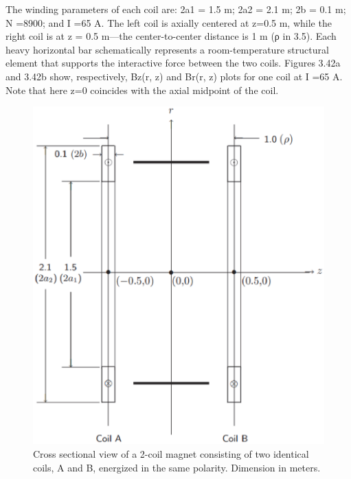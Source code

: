 The winding parameters of each coil are: 2a1 = 1.5 m; 2a2 = 2.1 m; 2b = 0.1 m;
N =8900; and I =65 A. The left coil is axially centered at z=0.5 m, while the right
coil is at z = 0.5 m—the center-to-center distance is 1 m (ρ in 3.5). Each heavy
horizontal bar schematically represents a room-temperature structural element
that supports the interactive force between the two coils.
Figures 3.42a and 3.42b show, respectively, Bz(r, z) and Br(r, z) plots for one coil
at I =65 A. Note that here z=0 coincides with the axial midpoint of the coil.
\begin{figure}[htbp]
	\centering
	\includegraphics[scale=0.5]{chpt3/figs/fig3.41.eps}
	\caption{Cross sectional view of a 2-coil magnet consisting of two identical coils,
		A and B, energized in the same polarity. Dimension in meters.}
\end{figure}

